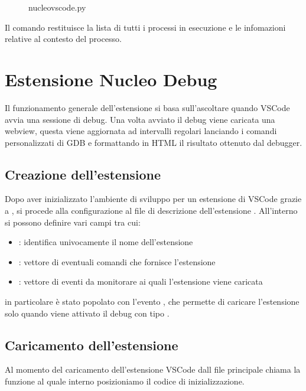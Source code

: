 \begin{figure}[H]
    
    \caption{nucleo\textunderscore vscode.py}
\end{figure}

Il comando  restituisce la lista di tutti i processi in esecuzione e le infomazioni relative al contesto del processo.

\section{Estensione Nucleo Debug}
Il funzionamento generale dell'estensione si basa sull'ascoltare quando VSCode avvia una sessione di debug. Una volta avviato il debug viene caricata una webview, questa viene aggiornata ad intervalli regolari lanciando i comandi personalizzati di GDB e formattando in HTML il risultato ottenuto dal debugger. 

\subsection{Creazione dell'estensione}
Dopo aver inizializzato l'ambiente di sviluppo per un estensione di VSCode grazie a , si procede alla configurazione al file di descrizione dell'estensione . All'interno si possono definire vari campi tra cui:

\begin{itemize}
    \item {}: identifica univocamente il nome dell'estensione
    \item {}: vettore di eventuali comandi che fornisce l'estensione 
    \item {}: vettore di eventi da monitorare ai quali l'estensione viene caricata
\end{itemize}

in particolare  è stato popolato con l'evento \linebreak {}, che permette di caricare l'estensione solo quando viene attivato il debug con tipo .

\subsection{Caricamento dell'estensione}
Al momento del caricamento dell'estensione VSCode dall file principale \linebreak {} chiama la funzione  al quale interno posizioniamo il codice di inizializzazione. 

